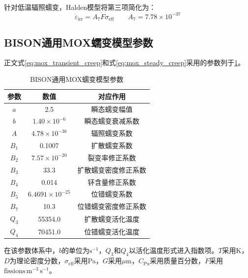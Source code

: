 针对低温辐照蠕变，Halden模型将第三项简化为\cite{hwr-1039}：
\begin{equation}
	\dot{\varepsilon}_{\mathrm{irr}}
	=A_7\dot{F}\sigma_{\mathrm{eff}}
	\qquad A_7=7.78\times10^{-37}
	\label{eq:appendix_halden_irradiation_creep}
\end{equation}

\subsection{BISON通用MOX蠕变模型参数}

正文式\eqref{eq:mox_transient_creep}和式\eqref{eq:mox_steady_creep}采用的参数列于\tablename\ref{tab:appendix_bison_mox_creep_parameters}。

\begin{table}[htbp]
	\centering
	\caption{BISON通用MOX蠕变模型参数}
	\label{tab:appendix_bison_mox_creep_parameters}
	\begin{tabular*}{\textwidth}{
			@{\extracolsep{\fill}}
			ccc
			@{}
		}
		\toprule
		参数 & 数值 & 对应作用 \\
		\midrule
		$a$   & 2.5                      & 瞬态蠕变幅值 \\
		$b$   & $1.40\times10^{-6}$      & 瞬态蠕变衰减系数 \\
		$A$   & $4.78\times10^{-36}$     & 辐照蠕变系数 \\
		$B_1$ & 0.1007                   & 扩散蠕变系数 \\
		$B_2$ & $7.57\times10^{-20}$     & 裂变率修正系数 \\
		$B_3$ & 33.3                     & 扩散蠕变密度修正系数 \\
		$B_4$ & 0.014                    & 钚含量修正系数 \\
		$B_5$ & $6.4691\times10^{-25}$   & 位错蠕变系数 \\
		$B_7$ & 10.3                     & 位错蠕变密度修正系数 \\
		$Q_3$ & 55354.0                  & 扩散蠕变活化温度 \\
		$Q_4$ & 70451.0                  & 位错蠕变活化温度 \\
		\bottomrule
	\end{tabular*}
\end{table}

在该参数体系中，$b$的单位为$\mathrm{s^{-1}}$，$Q_3$和$Q_4$以活化温度形式进入指数项。$T$采用K，$D$为理论密度分数，$\sigma_{\mathrm{eff}}$采用Pa，$G$采用$\mu\mathrm{m}$，$C_{\mathrm{Pu}}$采用质量百分数，$\dot{F}$采用$\mathrm{fissions\,m^{-3}\,s^{-1}}$。

